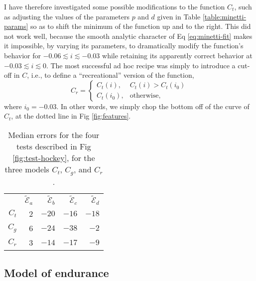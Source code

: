 \documentclass[10pt,letterpaper]{article}
\begin{document}
I have therefore investigated some possible modifications to the function
$C_t$, such as adjusting the values of the parameters $p$ and $d$
given in Table \ref{table:minetti-params} so as to shift the minimum of
the function up and to the right. This did not work well, because the smooth
analytic character of Eq \eqref{eq:minetti-fit} makes it impossible, by varying its parameters, to 
dramatically modify the function's behavior for $-0.06\lesssim i \lesssim -0.03$
while retaining its apparently correct behavior at $-0.03 \lesssim i \lesssim 0$.
The most successful ad hoc recipe was simply to introduce a cut-off in $C$, i.e.,
to define a ``recreational'' version of the function,
\begin{equation}\label{eq:rec}
  C_r =   \begin{cases}
     C_t(i), & C_t(i)>C_t(i_0) \\
     C_t(i_0), & \text{otherwise},
  \end{cases}
\end{equation}
where $i_0=-0.03$.
In other words, we simply chop the bottom off of the curve of $C_t$, at the dotted
line in Fig \ref{fig:features}.

\begin{table}[h]
\begin{tabular}{rrrrr}
       & $\widetilde{\mathcal{E}}_a$ & $\widetilde{\mathcal{E}}_b$ & $\widetilde{\mathcal{E}}_c$ & $\widetilde{\mathcal{E}}_d$  \\
$C_t$  & 2 & $-20$ & $-16$ & $-18$ \\
$C_g$  & 6 & $-24$ & $-38$ & $-2$ \\
$C_r$  & 3 & $-14$ & $-17$ & $-9$ \\
\end{tabular}
\label{table:goodness}
\caption{Median errors for the four tests described in Fig \ref{fig:test-hockey}, for the three models
$C_t$, $C_g$, and $C_r$.}
\end{table}

\subsection*{Model of endurance}
\end{document}
